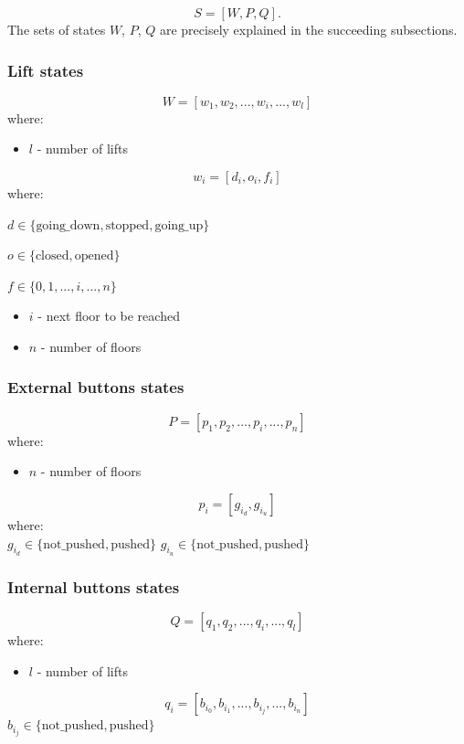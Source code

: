 \documentclass[12pt]{article}
\begin{document}
\[ S = [W, P, Q]. \]
\newline
The sets of states $W$, $P$, $Q$ are precisely explained in the succeeding subsections.

\subsubsection{Lift states}

\[ W=[w_1, w_2, ..., w_i, ..., w_l ]\]
where:
\begin{itemize}
  \item \(l\) - number of lifts
\end{itemize}

\[ w_i = [d_i, o_i, f_i] \]
where:

\(d \in \{\text{going\_down},\text{stopped},\text{going\_up}\}\)

\(o \in \{\text{closed},\text{opened}\}\)

\(f \in \{0,1,...,i,...,n\}\)
\begin{itemize}
  \item \(i\) - next floor to be reached
  \item \(n\) - number of floors
\end{itemize}


\subsubsection{External buttons states}

\[ P = [p_1, p_2, ..., p_i, ..., p_n] \]
where:
\begin{itemize}
  \item \(n\) - number of floors
\end{itemize}

\[ p_i = [g_{i_d}, g_{i_u}] \]
where:\\
\(g_{i_d} \in \{\text{not\_pushed},\text{pushed}\}\)
\(g_{i_u} \in \{\text{not\_pushed},\text{pushed}\}\)\\


\subsubsection{Internal buttons states}
\[ Q = [q_1, q_2, ..., q_i, ..., q_l] \]
where:
\begin{itemize}
  \item \(l\) - number of lifts
\end{itemize}
\[q_i = [b_{i_0}, b_{i_1}, ..., b_{i_j}, ..., b_{i_n}] \]
\(b_{i_j} \in \{\text{not\_pushed},\text{pushed}\} \)
\end{document}
